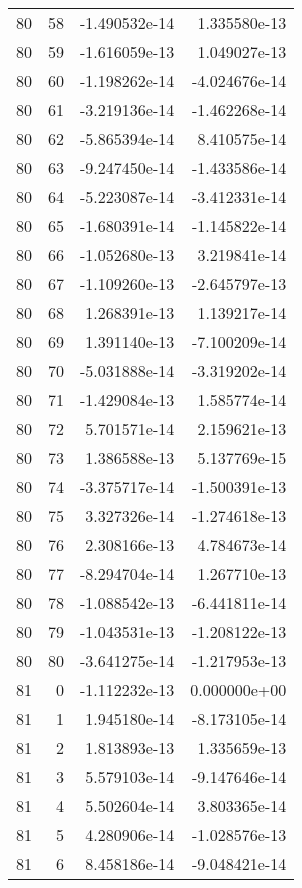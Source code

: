 \begin{tabular}{rrrr}
  80 &   58 & -1.490532e-14 &  1.335580e-13 \\
  80 &   59 & -1.616059e-13 &  1.049027e-13 \\
  80 &   60 & -1.198262e-14 & -4.024676e-14 \\
  80 &   61 & -3.219136e-14 & -1.462268e-14 \\
  80 &   62 & -5.865394e-14 &  8.410575e-14 \\
  80 &   63 & -9.247450e-14 & -1.433586e-14 \\
  80 &   64 & -5.223087e-14 & -3.412331e-14 \\
  80 &   65 & -1.680391e-14 & -1.145822e-14 \\
  80 &   66 & -1.052680e-13 &  3.219841e-14 \\
  80 &   67 & -1.109260e-13 & -2.645797e-13 \\
  80 &   68 &  1.268391e-13 &  1.139217e-14 \\
  80 &   69 &  1.391140e-13 & -7.100209e-14 \\
  80 &   70 & -5.031888e-14 & -3.319202e-14 \\
  80 &   71 & -1.429084e-13 &  1.585774e-14 \\
  80 &   72 &  5.701571e-14 &  2.159621e-13 \\
  80 &   73 &  1.386588e-13 &  5.137769e-15 \\
  80 &   74 & -3.375717e-14 & -1.500391e-13 \\
  80 &   75 &  3.327326e-14 & -1.274618e-13 \\
  80 &   76 &  2.308166e-13 &  4.784673e-14 \\
  80 &   77 & -8.294704e-14 &  1.267710e-13 \\
  80 &   78 & -1.088542e-13 & -6.441811e-14 \\
  80 &   79 & -1.043531e-13 & -1.208122e-13 \\
  80 &   80 & -3.641275e-14 & -1.217953e-13 \\
  81 &    0 & -1.112232e-13 &  0.000000e+00 \\
  81 &    1 &  1.945180e-14 & -8.173105e-14 \\
  81 &    2 &  1.813893e-13 &  1.335659e-13 \\
  81 &    3 &  5.579103e-14 & -9.147646e-14 \\
  81 &    4 &  5.502604e-14 &  3.803365e-14 \\
  81 &    5 &  4.280906e-14 & -1.028576e-13 \\
  81 &    6 &  8.458186e-14 & -9.048421e-14 \\

\end{tabular}
